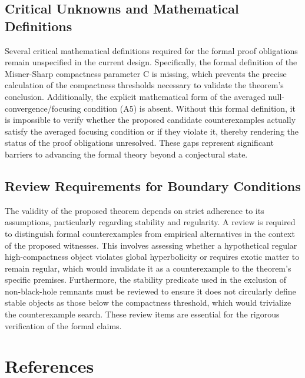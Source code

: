 \documentclass[conference]{IEEEtran}
\begin{document}
\subsection{Critical Unknowns and Mathematical Definitions}
Several critical mathematical definitions required for the formal proof obligations remain unspecified in the current design. Specifically, the formal definition of the Misner-Sharp compactness parameter C is missing, which prevents the precise calculation of the compactness thresholds necessary to validate the theorem's conclusion. Additionally, the explicit mathematical form of the averaged null-convergence/focusing condition (A5) is absent. Without this formal definition, it is impossible to verify whether the proposed candidate counterexamples actually satisfy the averaged focusing condition or if they violate it, thereby rendering the status of the proof obligations unresolved. These gaps represent significant barriers to advancing the formal theory beyond a conjectural state.

\subsection{Review Requirements for Boundary Conditions}
The validity of the proposed theorem depends on strict adherence to its assumptions, particularly regarding stability and regularity. A review is required to distinguish formal counterexamples from empirical alternatives in the context of the proposed witnesses. This involves assessing whether a hypothetical regular high-compactness object violates global hyperbolicity or requires exotic matter to remain regular, which would invalidate it as a counterexample to the theorem's specific premises. Furthermore, the stability predicate used in the exclusion of non-black-hole remnants must be reviewed to ensure it does not circularly define stable objects as those below the compactness threshold, which would trivialize the counterexample search. These review items are essential for the rigorous verification of the formal claims.\section*{References}
\nocite{cite_07d6df5d6978a1fc,cite_0ed84243cf171bc4,cite_1e54e3c2b35110ad,cite_2576833bf7ef143a,cite_283d00782f1f9ecb,cite_357dd780a9e3a378,cite_364386a3569b6e66,cite_37ecbded9d629353,cite_42e341ff6471ce89,cite_572fec0a1e5d74d9,cite_5ea4dc0e1b288757,cite_63476e0b002da386,cite_72d7ff391b29c495,cite_789b47fb0241d9ae,cite_7a407c865faafd11,cite_7a44e6730c44cb39,cite_7ae92f06684c60ef,cite_977568cf7b8a55bf,cite_98c5e596c0c34b68,cite_bfae3a92efd1d48f,cite_c369df652181e8f7,cite_cbbced417410bc6c,cite_cc5bc07a219047b4,cite_d3016ce6d1faa8ec,cite_e228b5fd31e37646,cite_e7b42f305bc08498,cite_ecea60a2300e4892,cite_f634820e22d7a238,cite_fd0f77b2a173c0ab}


\end{document}
